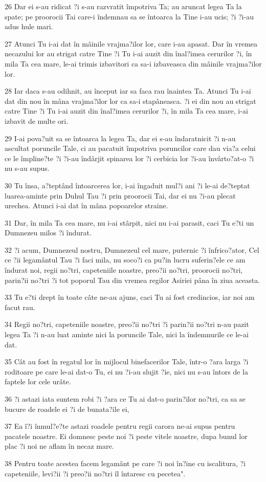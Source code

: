 \par 26 Dar ei s-au ridicat ?i s-au razvratit împotriva Ta; au aruncat legea Ta la spate; pe proorocii Tai care-i îndemnau sa se întoarca la Tine i-au ucis; ?i ?i-au adus hule mari.
\par 27 Atunci Tu i-ai dat în mâinile vrajma?ilor lor, care i-au apasat. Dar în vremea necazului lor au strigat catre Tine ?i Tu i-ai auzit din înal?imea cerurilor ?i, în mila Ta cea mare, le-ai trimis izbavitori ca sa-i izbaveasca din mâinile vrajma?ilor lor.
\par 28 Iar daca s-au odihnit, au început iar sa faca rau înaintea Ta. Atunci Tu i-ai dat din nou în mâna vrajma?ilor lor ca sa-i stapâneasca. ?i ei din nou au strigat catre Tine ?i Tu i-ai auzit din înal?imea cerurilor ?i, în mila Ta cea mare, i-ai izbavit de multe ori.
\par 29 I-ai pova?uit sa se întoarca la legea Ta, dar ei s-au îndaratnicit ?i n-au ascultat poruncile Tale, ci au pacatuit împotriva poruncilor care dau via?a celui ce le împline?te ?i ?i-au îndârjit spinarea lor ?i cerbicia lor ?i-au învârto?at-o ?i nu s-au supus.
\par 30 Tu însa, a?teptând întoarcerea lor, i-ai îngaduit mul?i ani ?i le-ai de?teptat luarea-aminte prin Duhul Tau ?i prin proorocii Tai, dar ei nu ?i-au plecat urechea. Atunci i-ai dat în mâna popoarelor straine.
\par 31 Dar, în mila Ta cea mare, nu i-ai stârpit, nici nu i-ai parasit, caci Tu e?ti un Dumnezeu milos ?i îndurat.
\par 32 ?i acum, Dumnezeul nostru, Dumnezeul cel mare, puternic ?i înfrico?ator, Cel ce ?ii legamântul Tau ?i faci mila, nu soco?i ca pu?in lucru suferin?ele ce am îndurat noi, regii no?tri, capeteniile noastre, preo?ii no?tri, proorocii no?tri, parin?ii no?tri ?i tot poporul Tau din vremea regilor Asiriei pâna în ziua aceasta.
\par 33 Tu e?ti drept în toate câte ne-au ajuns, caci Tu ai fost credincios, iar noi am facut rau.
\par 34 Regii no?tri, capeteniile noastre, preo?ii no?tri ?i parin?ii no?tri n-au pazit legea Ta ?i n-au luat aminte nici la poruncile Tale, nici la îndemnurile ce le-ai dat.
\par 35 Cât au fost în regatul lor în mijlocul binefacerilor Tale, într-o ?ara larga ?i roditoare pe care le-ai dat-o Tu, ei nu ?i-au slujit ?ie, nici nu s-au întors de la faptele lor cele urâte.
\par 36 ?i astazi iata suntem robi ?i ?ara ce Tu ai dat-o parin?ilor no?tri, ca sa se bucure de roadele ei ?i de bunata?ile ei,
\par 37 Ea î?i înmul?e?te astazi roadele pentru regii carora ne-ai supus pentru pacatele noastre. Ei domnesc peste noi ?i peste vitele noastre, dupa bunul lor plac ?i noi ne aflam în necaz mare.
\par 38 Pentru toate acestea facem legamânt pe care ?i noi în?ine cu iscalitura, ?i capeteniile, levi?ii ?i preo?ii no?tri îl întaresc cu pecetea".

